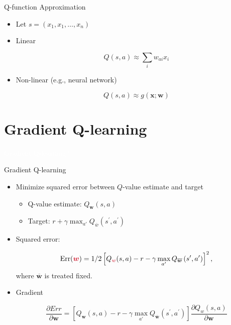 \documentclass[11pt,table]{beamer}
\begin{document}
\begin{frame}{Q-function Approximation}


\begin{itemize}
    \item  Let $s=\left(x_{1}, x_{1}, \ldots, x_{n}\right)$

\item  Linear

$$Q(s, a) \approx \sum_{i} w_{a i} x_{i}$$

\item  Non-linear (e.g., neural network) 

$$Q(s, a) \approx g(\boldsymbol{x} ; \boldsymbol{w})$$ 
\end{itemize}
    
\end{frame}


\section{Gradient Q-learning}
{
\begin{frame}
\centering
\Huge
\textcolor{white}{Gradient Q-learning?}
\thispagestyle{empty}
\end{frame}
}




\begin{frame}{Gradient Q-learning}


    \begin{itemize}
        \item  Minimize squared error between $Q$-value estimate and target

        \begin{itemize}
               
\item  Q-value estimate: $Q_{\textbf{w}}(s, a)$
\item  Target: $r+\gamma \max_{a \prime} Q_{\bar{w}}\left(s^{\prime}, a^{\prime}\right)$
\end{itemize}
\item  Squared error:

$$
\operatorname{Err}(\boldsymbol{\textcolor{red1}{w}})=1 / 2\left[Q_{\textcolor{red1}{w}}(s, a)-r-\gamma \max _{a^{\prime}} Q_{\overline{\boldsymbol{w}}}\left(s^{\prime}, a^{\prime}\right)\right]^{2},
$$
where $\overline{\boldsymbol{w}}$ is treated fixed.
\item  Gradient

%
%
$$
\frac{\partial E r r}{\partial \boldsymbol{w}}=\left[Q_{\boldsymbol{w}}(s, a)-r-\gamma \max _{a \prime} Q_{\overline{\boldsymbol{w}}}\left(s^{\prime}, a^{\prime}\right)\right] \frac{\partial Q_{w}(s, a)}{\partial \boldsymbol{w}}
$$ 
    \end{itemize}
\end{frame}
\end{document}

